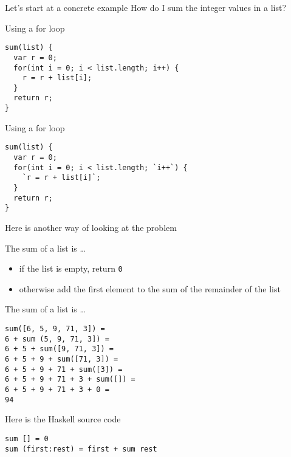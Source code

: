 \begin{frame}
\begin{block}{Let's start at a concrete example}
How do I sum the integer values in a list?
\end{block}
\end{frame}

\begin{frame}[fragile]
\begin{block}{Using a for loop}
\begin{lstlisting}[style=java]
sum(list) {
  var r = 0;
  for(int i = 0; i < list.length; i++) {
    r = r + list[i];
  }
  return r;
}
\end{lstlisting}
\end{block}
\end{frame}

\begin{frame}[fragile]
\begin{block}{Using a for loop}
\begin{lstlisting}[style=java]
sum(list) {
  var r = 0;
  for(int i = 0; i < list.length; `i++`) {
    `r = r + list[i]`;
  }
  return r;
}
\end{lstlisting}
\end{block}
\end{frame}

\begin{frame}
\begin{center}
Here is another way of looking at the problem
\end{center}
\end{frame}

\begin{frame}
\begin{block}{The sum of a list is \ldots}
\begin{itemize}
\item if the list is empty, return \lstinline{0}
\item otherwise add the first element to the sum of the remainder of the list
\end{itemize}
\end{block}
\end{frame}

\begin{frame}[fragile]
\begin{block}{The sum of a list is \ldots}
\begin{lstlisting}
sum([6, 5, 9, 71, 3]) =
6 + sum (5, 9, 71, 3]) =
6 + 5 + sum([9, 71, 3]) =
6 + 5 + 9 + sum([71, 3]) =
6 + 5 + 9 + 71 + sum([3]) =
6 + 5 + 9 + 71 + 3 + sum([]) =
6 + 5 + 9 + 71 + 3 + 0 =
94
\end{lstlisting}
\end{block}
\end{frame}

\begin{frame}[fragile]
\begin{block}{Here is the Haskell source code}
\begin{lstlisting}[style=haskell]
sum [] = 0
sum (first:rest) = first + sum rest
\end{lstlisting}
\end{block}
\end{frame}
